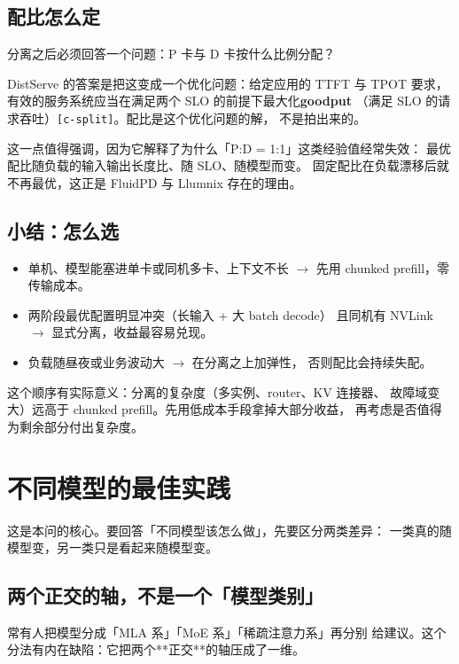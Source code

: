 \subsection{配比怎么定}

分离之后必须回答一个问题：P 卡与 D 卡按什么比例分配？

DistServe 的答案是把这变成一个优化问题：给定应用的 TTFT 与 TPOT 要求，
有效的服务系统应当在满足两个 SLO 的前提下最大化\textbf{goodput}
（满足 SLO 的请求吞吐）\texttt{[c-split]}。配比是这个优化问题的解，
不是拍出来的。

这一点值得强调，因为它解释了为什么「P:D = 1:1」这类经验值经常失效：
最优配比随负载的输入输出长度比、随 SLO、随模型而变。
固定配比在负载漂移后就不再最优，这正是 FluidPD 与 Llumnix 存在的理由。

\subsection{小结：怎么选}

\begin{itemize}[leftmargin=1.3em,itemsep=1.5pt,topsep=2pt]
  \item 单机、模型能塞进单卡或同机多卡、上下文不长
        $\rightarrow$ 先用 chunked prefill，零传输成本。
  \item 两阶段最优配置明显冲突（长输入 + 大 batch decode）
        且同机有 NVLink $\rightarrow$ 显式分离，收益最容易兑现。
  \item 负载随昼夜或业务波动大 $\rightarrow$ 在分离之上加弹性，
        否则配比会持续失配。
\end{itemize}

这个顺序有实际意义：分离的复杂度（多实例、router、KV 连接器、
故障域变大）远高于 chunked prefill。先用低成本手段拿掉大部分收益，
再考虑是否值得为剩余部分付出复杂度。

\section{不同模型的最佳实践}
\label{sec:model}

这是本问的核心。要回答「不同模型该怎么做」，先要区分两类差异：
一类真的随模型变，另一类只是看起来随模型变。

\subsection{两个正交的轴，不是一个「模型类别」}

\noindent 常有人把模型分成「MLA 系」「MoE 系」「稀疏注意力系」再分别
给建议。这个分法有内在缺陷：它把两个**正交**的轴压成了一维。

